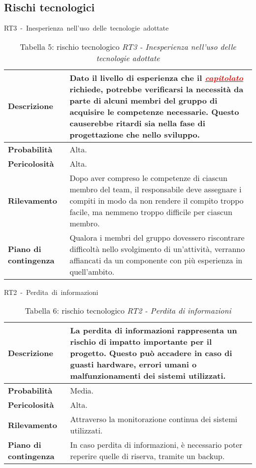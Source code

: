 \documentclass[italian,12pt]{article} %
\begin{document}
\begin{table}[!h]
    \subsection{Rischi tecnologici}
    \centering
    \hbox{RT3 - Inesperienza nell'uso delle tecnologie adottate}
    \vspace{0.3cm}
	\begin{tabular}{|l|p{10cm}|} 
		\hline
		\textbf{Descrizione} & Dato il livello di esperienza che il \textcolor{red}{\uline{\textit{capitolato}}} richiede, potrebbe verificarsi la necessità da parte di alcuni membri del gruppo di acquisire le competenze necessarie. Questo causerebbe ritardi sia nella fase di progettazione che nello sviluppo.  \\ 
        \hline
        \textbf{Probabilità} & Alta. \\
        \hline
        \textbf{Pericolosità} & Alta. \\
        \hline
        \textbf{Rilevamento} & Dopo aver compreso le competenze di ciascun membro del team, il responsabile deve assegnare i compiti in modo da non rendere il compito troppo facile, ma nemmeno troppo difficile per ciascun membro.  \\
        \hline
        \textbf{Piano di contingenza} & Qualora i membri del gruppo dovessero riscontrare difficoltà nello svolgimento di un'attività, verranno affiancati da un componente con più esperienza in quell'ambito. \\
		\hline
	\end{tabular}
    \caption{Tabella 5: rischio tecnologico \textit{RT3 - Inesperienza nell'uso delle tecnologie adottate}}
\end{table}

\begin{table}[!h]
    \centering
    \hbox{RT2 - Perdita di informazioni}
    \vspace{0.3cm}
	\begin{tabular}{|l|p{10cm}|} 
		\hline
		\textbf{Descrizione} & La perdita di informazioni rappresenta un rischio di impatto importante per il progetto. Questo può accadere in caso di guasti hardware, errori umani o malfunzionamenti dei sistemi utilizzati. \\ 
        \hline
        \textbf{Probabilità} & Media. \\
        \hline
        \textbf{Pericolosità} & Alta. \\
        \hline
        \textbf{Rilevamento} & Attraverso la monitorazione continua dei sistemi utilizzati. \\
        \hline
        \textbf{Piano di contingenza} & In caso perdita di informazioni, è necessario poter reperire quelle di riserva, tramite un backup. \\
		\hline
	\end{tabular}
    \caption{Tabella 6: rischio tecnologico \textit{RT2 - Perdita di informazioni}}
\end{table}
\end{document}
